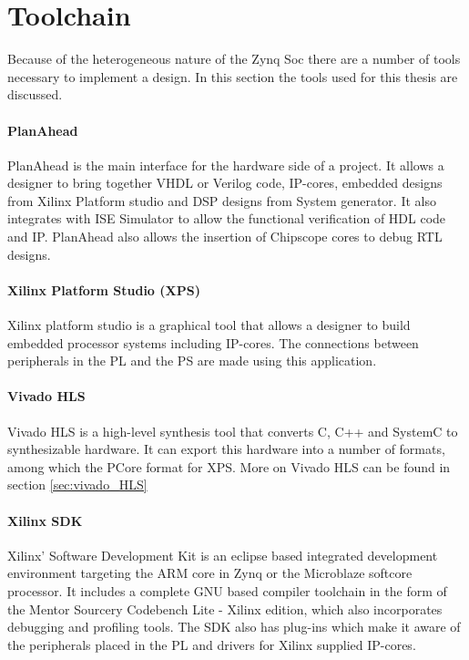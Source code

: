 \newpage

\section{Toolchain}
Because of the heterogeneous nature of the Zynq Soc there are a number of tools necessary to implement a design. In this section the tools used for this thesis are discussed.

\paragraph{PlanAhead} PlanAhead is the main interface for the hardware side of a project. It allows a designer to bring together VHDL or Verilog code, IP-cores, embedded designs from Xilinx Platform studio and DSP designs from System generator. It also integrates with ISE Simulator to allow the functional verification of HDL code and IP. PlanAhead also allows the insertion of Chipscope cores to debug RTL designs.

\paragraph{Xilinx Platform Studio (XPS)} Xilinx platform studio is a graphical tool that allows a designer to build embedded processor systems including IP-cores. The connections between peripherals in the PL and the PS are made using this application.

\paragraph{Vivado HLS} Vivado HLS is a high-level synthesis tool that converts C, C++ and SystemC to synthesizable hardware. It can export this hardware into a number of formats, among which the PCore format for XPS. More on Vivado HLS can be found in section \ref{sec:vivado_HLS}

\paragraph{Xilinx SDK} Xilinx' Software Development Kit is an eclipse based integrated development environment targeting the ARM core in Zynq or the Microblaze softcore processor. It includes a complete GNU based compiler toolchain in the form of the Mentor Sourcery Codebench Lite - Xilinx edition, which also incorporates debugging and profiling tools. The SDK also has plug-ins which make it aware of the peripherals placed in the PL and drivers for Xilinx supplied IP-cores.

